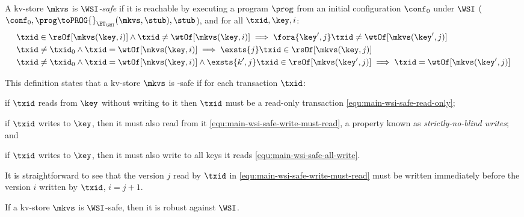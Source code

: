 \begin{definition}
\label{def:main-body-wsi-safe}
    A kv-store \( \mkvs \) is \emph{\(\WSI\)-safe} if it is 
    reachable by executing a program \( \prog \) from an initial configuration \( \conf_0 \) under $\WSI$
   (\ie \( \conf_0, \prog \toPROG{}_{\ET_\WSI} (\mkvs, \stub), \stub\)), and for all $\txid, \key, i$:
    \begin{align}
         & \txid \in \rsOf[\mkvs(\key,i)] \land \txid \neq \wtOf[\mkvs(\key,i)]  \implies \fora{\key',j} \txid \neq \wtOf[\mkvs(\key',j)] \label{equ:main-wsi-safe-read-only} \\
         & \txid \neq \txid_0 \land \txid = \wtOf[\mkvs(\key,i)] \implies \exsts{j} \txid \in \rsOf[\mkvs(\key,j)] \label{equ:main-wsi-safe-write-must-read} \\
         & \txid \neq \txid_0 \land \txid = \wtOf[\mkvs(\key,i)] \land \exsts{k', j} \txid \in \rsOf[\mkvs(\key',j)] \implies \txid = \wtOf[\mkvs(\key',j)] \label{equ:main-wsi-safe-all-write}
    \end{align}
\end{definition}

This definition states that a kv-store $\mkvs$ is \WSI-safe if for each transaction $\txid$: 
\begin{enumerate*} 
    \item if $\txid$ reads from $\key$ without writing to it then $\txid$ must be a read-only transaction \eqref{equ:main-wsi-safe-read-only}; 
    \item if \( \txid \) writes to $\key$, then it must also read from it \eqref{equ:main-wsi-safe-write-must-read}, a property known as \emph{strictly-no-blind writes}; and
	\item  if \( \txid \) writes to $\key$, then it must also write to all keys it reads \eqref{equ:main-wsi-safe-all-write}.
\end{enumerate*}
It is straightforward to see that the version $j$ read by \( \txid \) in \eqref{equ:main-wsi-safe-write-must-read} must be written immediately before the version $i$ written by \( \txid \), \ie \( i {=} j + 1 \).

\begin{theorem}
 \label{thm:main-wsi-robust}
    If a kv-store \( \mkvs \) is \(\WSI\)-safe, then it is robust against \(\WSI\).   
\end{theorem}


